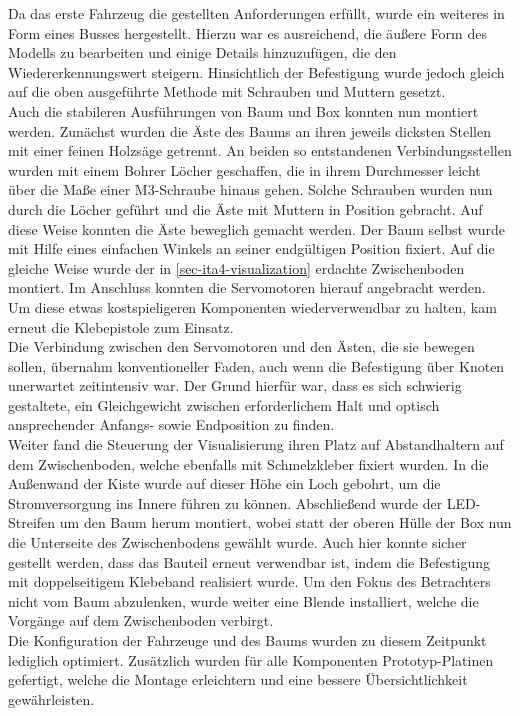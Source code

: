 \documentclass[.../Dokumentation.tex]{subfiles}
\begin{document}
\noindent 
Da das erste Fahrzeug die gestellten Anforderungen erfüllt, wurde ein weiteres 
in Form eines Busses hergestellt. Hierzu war es ausreichend, die äußere Form 
des Modells zu bearbeiten und einige Details hinzuzufügen, die den 
Wiedererkennungswert steigern. Hinsichtlich der Befestigung wurde jedoch 
gleich auf die oben ausgeführte Methode mit Schrauben und Muttern gesetzt.\\
Auch die stabileren Ausführungen von Baum und Box konnten nun montiert werden. Zunächst wurden die Äste des Baums an ihren jeweils dicksten Stellen mit einer 
feinen Holzsäge getrennt. An beiden so entstandenen Verbindungsstellen wurden 
mit einem Bohrer Löcher geschaffen, die in ihrem Durchmesser leicht über die 
Maße einer M3-Schraube hinaus gehen. Solche Schrauben wurden nun durch die 
Löcher geführt und die Äste mit Muttern in Position gebracht. 
Auf diese Weise konnten die Äste beweglich gemacht werden. 
Der Baum selbst wurde mit Hilfe eines einfachen Winkels an seiner endgültigen 
Position fixiert.
Auf die gleiche Weise wurde der in \ref{sec-ita4-visualization} erdachte 
Zwischenboden montiert. Im Anschluss konnten die Servomotoren hierauf angebracht 
werden. Um diese etwas kostspieligeren Komponenten wiederverwendbar zu halten, 
kam erneut die Klebepistole zum Einsatz.\\
Die Verbindung zwischen den Servomotoren und den Ästen, die sie bewegen sollen, 
übernahm konventioneller Faden, auch wenn die Befestigung über Knoten 
unerwartet zeitintensiv war. Der Grund hierfür war, dass es sich schwierig 
gestaltete, ein Gleichgewicht zwischen erforderlichem Halt und  
optisch ansprechender Anfangs- sowie Endposition zu finden.\\
Weiter fand die Steuerung der Visualisierung ihren Platz auf Abstandhaltern auf 
dem Zwischenboden, welche ebenfalls mit Schmelzkleber fixiert wurden.
In die Außenwand der Kiste wurde auf dieser Höhe ein Loch gebohrt, um die 
Stromversorgung ins Innere führen zu können. 
Abschließend wurde der LED-Streifen um den Baum herum montiert, wobei statt der 
oberen Hülle der Box nun die Unterseite des Zwischenbodens gewählt wurde. 
Auch hier konnte sicher gestellt werden, dass das Bauteil erneut verwendbar 
ist, indem die Befestigung mit doppelseitigem Klebeband realisiert wurde. Um den Fokus des Betrachters nicht vom Baum abzulenken, wurde weiter eine 
Blende installiert, welche die Vorgänge auf dem Zwischenboden verbirgt.\\
Die Konfiguration der Fahrzeuge und des Baums wurden zu diesem Zeitpunkt lediglich optimiert. Zusätzlich wurden für alle Komponenten Prototyp-Platinen gefertigt, welche die Montage erleichtern und eine bessere Übersichtlichkeit gewährleisten. 
\end{document}
